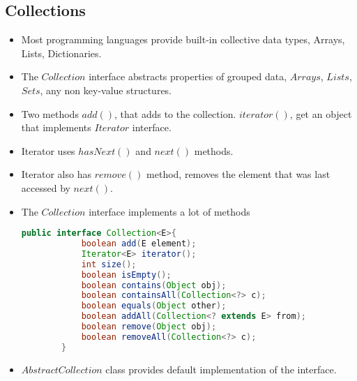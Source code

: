 \documentclass[a4paper]{article}
\begin{document}
\subsection{Collections}
\begin{itemize}
    \item Most programming languages provide built-in collective data types, Arrays, Lists, Dictionaries.
    \item The $Collection$ interface abstracts properties of grouped data, $Arrays$, $Lists$, $Sets$, any non key-value structures.
    \item Two methods $add()$, that adds to the collection. $iterator()$, get an object that implements $Iterator$ interface.
    \item Iterator uses $hasNext()$ and $next()$ methods.
    \item Iterator also has $remove()$ method, removes the element that was last accessed by $next()$.
    \item The $Collection$ interface implements a lot of methods
    \begin{lstlisting}[language=Java]
        public interface Collection<E>{
            boolean add(E element);
            Iterator<E> iterator();
            int size();
            boolean isEmpty();
            boolean contains(Object obj);
            boolean containsAll(Collection<?> c);
            boolean equals(Object other);
            boolean addAll(Collection<? extends E> from);
            boolean remove(Object obj);
            boolean removeAll(Collection<?> c);
        }
    \end{lstlisting}
    \item $AbstractCollection$ class provides default implementation of the interface.
\end{itemize}
\end{document}
